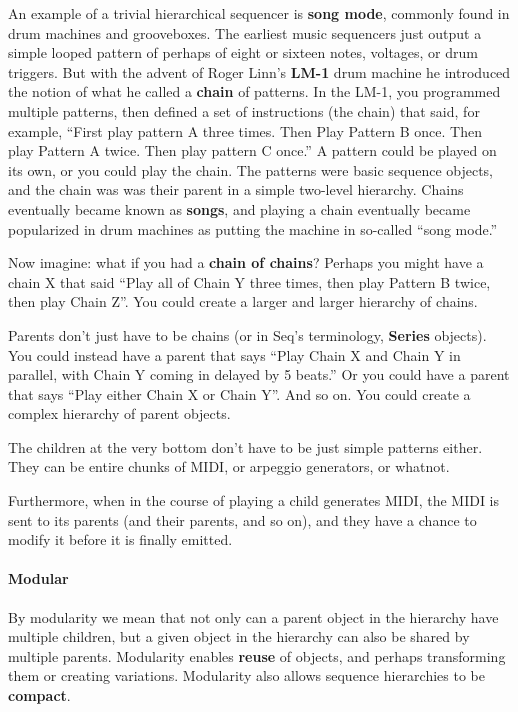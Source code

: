 \documentclass[twoside,10pt]{article}
\begin{document}
An example of a trivial hierarchical sequencer is {\bf song mode}, commonly found in drum machines and grooveboxes.  The earliest music sequencers just output a simple looped pattern of perhaps of eight or sixteen notes, voltages, or drum triggers.  But with the advent of Roger Linn's {\bf LM-1} drum machine he introduced the notion of what he called a {\bf chain} of patterns.  In the LM-1, you programmed multiple patterns, then defined a set of instructions (the chain) that said, for example, ``First play pattern A three times. Then Play Pattern B once.  Then play Pattern A twice.  Then play pattern C once.''   A pattern could be played on its own, or you could play the chain.  The patterns were basic sequence objects, and the chain was was their parent in a simple two-level hierarchy.   Chains eventually became known as {\bf songs}, and playing a chain eventually became popularized in drum machines as putting the machine in so-called ``song mode.''

Now imagine: what if you had a {\bf chain of chains}?  Perhaps you might have a chain X that said ``Play all of Chain Y three times, then play Pattern B twice, then play Chain Z''.  You could create a larger and larger hierarchy of chains.

Parents don't just have to be chains (or in Seq's terminology, {\bf Series} objects).  You could instead have a parent that says ``Play Chain X and Chain Y in parallel, with Chain Y coming in delayed by 5 beats.''  Or you could have a parent that says ``Play either Chain X or Chain Y''.  And so on.  You could create a complex hierarchy of parent objects.

The children at the very bottom don't have to be just simple patterns either.  They can be entire chunks of MIDI, or arpeggio generators, or whatnot.  

Furthermore, when in the course of playing a child generates MIDI, the MIDI is sent to its parents (and their parents, and so on), and they have a chance to modify it before it is finally emitted.

\paragraph{Modular} By modularity we mean that not only can a parent object in the hierarchy have multiple children, but a given object in the hierarchy can also be shared by multiple parents.  Modularity enables {\bf reuse} of objects, and perhaps transforming them or creating variations.   Modularity also allows sequence hierarchies to be {\bf compact}.
\end{document}
